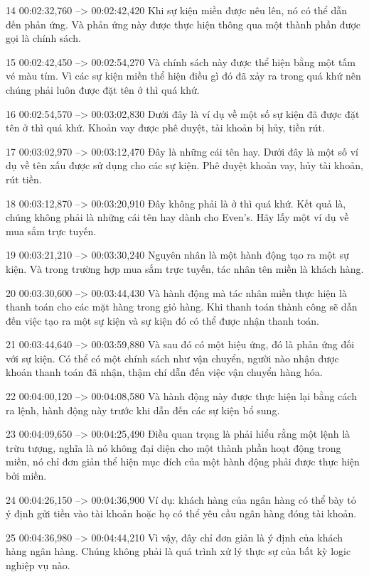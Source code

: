 14
00:02:32,760 --> 00:02:42,420
Khi sự kiện miền được nêu lên, nó có thể dẫn đến phản ứng.  Và phản ứng này được thực hiện thông qua một thành phần được gọi là chính sách.

15
00:02:42,450 --> 00:02:54,270
Và chính sách này được thể hiện bằng một tấm vé màu tím.  Vì các sự kiện miền thể hiện điều gì đó đã xảy ra trong quá khứ nên chúng phải luôn được đặt tên ở thì quá khứ.

16
00:02:54,570 --> 00:03:02,830
Dưới đây là ví dụ về một số sự kiện đã được đặt tên ở thì quá khứ.  Khoản vay được phê duyệt, tài khoản bị hủy, tiền rút.

17
00:03:02,970 --> 00:03:12,470
Đây là những cái tên hay.  Dưới đây là một số ví dụ về tên xấu được sử dụng cho các sự kiện.  Phê duyệt khoản vay, hủy tài khoản, rút ​​tiền.

18
00:03:12,870 --> 00:03:20,910
Đây không phải là ở thì quá khứ.  Kết quả là, chúng không phải là những cái tên hay dành cho Even's.  Hãy lấy một ví dụ về mua sắm trực tuyến.

19
00:03:21,210 --> 00:03:30,240
Nguyên nhân là một hành động tạo ra một sự kiện.  Và trong trường hợp mua sắm trực tuyến, tác nhân tên miền là khách hàng.

20
00:03:30,600 --> 00:03:44,430
Và hành động mà tác nhân miền thực hiện là thanh toán cho các mặt hàng trong giỏ hàng.  Khi thanh toán thành công sẽ dẫn đến việc tạo ra một sự kiện và sự kiện đó có thể được nhận thanh toán.

21
00:03:44,640 --> 00:03:59,880
Và sau đó có một hiệu ứng, đó là phản ứng đối với sự kiện.  Có thể có một chính sách như vận chuyển, người nào nhận được khoản thanh toán đã nhận, thậm chí dẫn đến việc vận chuyển hàng hóa.

22
00:04:00,120 --> 00:04:08,580
Và hành động này được thực hiện lại bằng cách ra lệnh, hành động này trước khi dẫn đến các sự kiện bổ sung.

23
00:04:09,650 --> 00:04:25,490
Điều quan trọng là phải hiểu rằng một lệnh là trừu tượng, nghĩa là nó không đại diện cho một thành phần hoạt động trong miền, nó chỉ đơn giản thể hiện mục đích của một hành động phải được thực hiện bởi miền.

24
00:04:26,150 --> 00:04:36,900
Ví dụ: khách hàng của ngân hàng có thể bày tỏ ý định gửi tiền vào tài khoản hoặc họ có thể yêu cầu ngân hàng đóng tài khoản.

25
00:04:36,980 --> 00:04:44,210
Vì vậy, đây chỉ đơn giản là ý định của khách hàng ngân hàng.  Chúng không phải là quá trình xử lý thực sự của bất kỳ logic nghiệp vụ nào.


